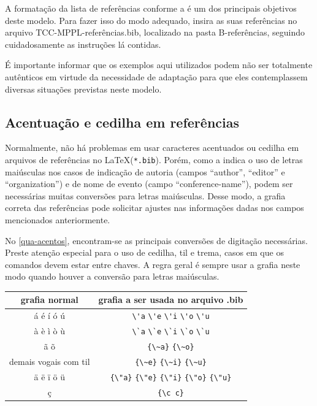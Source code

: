 A formatação da lista de referências conforme a  é um dos principais objetivos deste modelo. Para fazer isso do modo adequado, insira as suas referências no arquivo \textsf{TCC-MPPL-referências.bib}, localizado na pasta \textsf{B-referências}, seguindo cuidadosamente as instruções lá contidas.

É importante informar que os exemplos aqui utilizados podem não ser totalmente autênticos em virtude da necessidade de adaptação para que eles contemplassem diversas situações previstas neste modelo.

\subsection{Acentuação e cedilha em referências}

Normalmente, não há problemas em usar caracteres acentuados ou cedilha em arquivos
de referências no \LaTeX (\texttt{*.bib}). Porém, como a  indica o uso de letras maiúsculas nos casos de indicação de autoria (campos ``author'', ``editor'' e ``organization'') e de nome de evento (campo ``conference-name''), podem ser necessárias muitas conversões para letras maiúsculas. Desse modo, a grafia correta das referências pode solicitar ajustes nas informações dadas nos campos mencionados anteriormente.

No \autoref{qua-acentos}, encontram-se as principais conversões de digitação necessárias. Preste atenção especial para o uso de cedilha, til e trema, casos em que os comandos devem estar entre chaves. A regra geral é sempre usar a grafia neste modo quando houver a conversão para letras maiúsculas.

\begin{quadro}[htb]
\captionsetup{width=0.73\textwidth} %
\caption{Quadro de conversão de grafia} %
\label{qua-acentos} %
\begin{tabular}{|c|c|}\hline
\rowcolor{lightgray}
\textbf{grafia normal} & \textbf{grafia a ser usada no arquivo .bib}\\\hline
á é í ó ú & \verb+\'a+ \verb+\'e+ \verb+\'i+ \verb+\'o+ \verb+\'u+\\\hline
à è ì ò ù & \verb+\`a+ \verb+\`e+ \verb+\`i+ \verb+\`o+ \verb+\`u+\\\hline
ã õ & \verb+{\~a}+ \verb+{\~o}+\\\hline
demais vogais com til & \verb+{\~e}+ \verb+{\~i}+ \verb+{\~u}+\\\hline
ä ë ï ö ü & \verb+{\"a}+ \verb+{\"e}+ \verb+{\"i}+ \verb+{\"o}+ \verb+{\"u}+\\\hline
ç & \verb+{\c c}+\\
\hline
\end{tabular}
\end{quadro}

